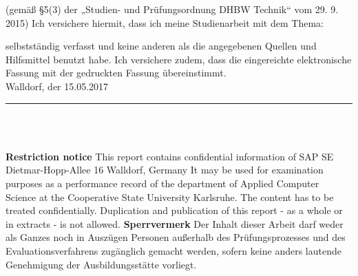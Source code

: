 \begin{spacing}{1.0}
(gemäß §5(3) der „Studien- und Prüfungsordnung DHBW Technik“ vom 29. 9. 2015) \newline
Ich versichere hiermit, dass ich meine Studienarbeit mit dem Thema: 
\begin{quote}
	\textit{\titel} 
\end{quote}  
selbstständig verfasst und keine anderen als die angegebenen Quellen und Hilfsmittel benutzt habe. Ich versichere zudem, dass die eingereichte elektronische Fassung mit der gedruckten Fassung übereinstimmt. \\


Walldorf, der 15.05.2017 \\[4ex]

\rule[-0.2cm]{5cm}{0.5pt} \\

\textsc{\autor} \\[10ex]
\end{spacing}

\newpage 

{\bfseries Restriction notice} \newline
This report contains confidential information of \newline
SAP SE \newline
Dietmar-Hopp-Allee 16  Walldorf, Germany \newline
It may be used for examination purposes as a performance record of the department
of Applied Computer Science at the Cooperative State University Karlsruhe.
The content has to be treated confidentially. \newline
Duplication and publication of this report - as a whole or in extracts - is not
allowed. \newline
\vskip 1cm
\textbf{Sperrvermerk} \newline
Der Inhalt dieser Arbeit darf weder als Ganzes noch in Ausz{\"u}gen Personen 
au{\ss}erhalb des Pr{\"u}fungsprozesses und des Evaluationsverfahrens
zug{\"a}nglich gemacht werden, sofern keine anders lautende Genehmigung der Ausbildungsst{\"a}tte vorliegt.